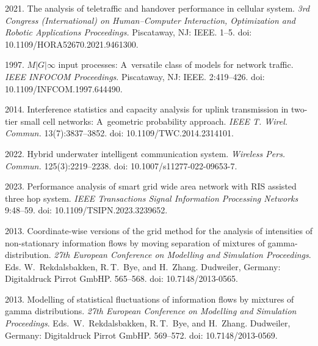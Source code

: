 \begin{multicols}{2}
{{\begin{thebibliography}{99}
 2021. The analysis of teletraffic and handover performance in cellular system. 
 \textit{3rd Congress (International) on Human--Computer Interaction, Optimization and Robotic Applications Proceedings.} 
 Piscataway, NJ: IEEE. 1--5. doi: 10.1109/\linebreak HORA52670.2021.9461300.

 1997. 
$M|G|\infty$ input processes: A~versatile class of models for network traffic. 
\textit{IEEE INFOCOM Proceedings}. Piscataway, NJ: IEEE. 2:419--426. doi: 10.1109/INFCOM.1997.644490.

 2014. Interference statistics and capacity analysis for uplink transmission in two-tier small cell networks: A~geometric probability approach. 
 \textit{IEEE T. Wirel. Commun.} 13(7):3837--3852. doi: 10.1109/TWC.2014.2314101.

 2022. 
Hybrid underwater intelligent communication system. \textit{Wireless Pers. Commun.} 125(3):2219--2238. doi: 10.1007/s11277-022-09653-7.

 2023.  Performance analysis of smart grid wide area network with RIS assisted three hop system. 
 \textit{IEEE Transactions Signal Information Processing Networks} 9:48--59. doi: 10.1109/TSIPN.2023.3239652.

 2013. Coordinate-wise versions of the grid method for the analysis of intensities of non-stationary information flows by moving separation of mixtures
  of gamma-distribution. \textit{27th European Conference on Modelling and Simulation Proceedings}. 
  Eds. W.~Rekdalsbakken, R.\,T.~Bye, and H.~Zhang. Dudweiler, Germany: Digitaldruck Pirrot GmbHP. 565--568. doi: 10.7148/2013-0565.

 2013. Modelling of statistical fluctuations of information flows by mixtures of gamma distributions. 
 \textit{27th European Conference on Modelling and Simulation Proceedings}. Eds.\ W.~Rekdalsbakken, R.\,T.~Bye, and H.~Zhang. 
 Dudweiler, Germany: Digitaldruck Pirrot GmbHP. 569--572. doi: 10.7148/2013-0569.


\end{thebibliography}}}
\end{multicols}
